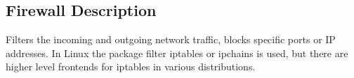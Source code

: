 \subsection{Firewall Description}

Filters the incoming and outgoing network traffic, blocks specific ports or
IP addresses. In Linux the package filter iptables or ipchains is used, but
there are higher level frontends for iptables in various distributions.
